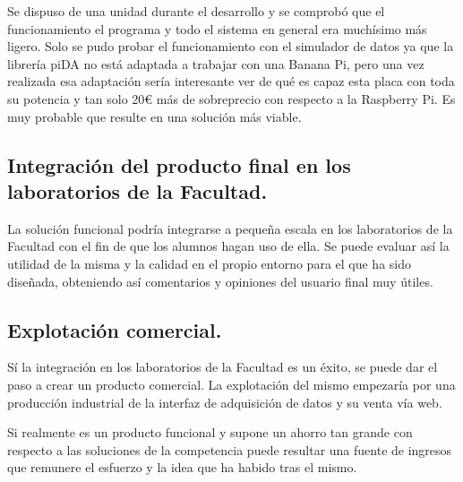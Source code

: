 	Se dispuso de una unidad durante el desarrollo y se comprobó que el funcionamiento el programa y todo el sistema en general era muchísimo más ligero. Solo se pudo probar el funcionamiento con el simulador de datos ya que la librería piDA no está adaptada a trabajar con una Banana Pi, pero una vez realizada esa adaptación sería interesante ver de qué es capaz esta placa con toda su potencia y tan solo 20€ más de sobreprecio con respecto a la Raspberry Pi. Es muy probable que resulte en una solución más viable.
	
	\subsection{Integración del producto final en los laboratorios de la Facultad.}
	La solución funcional podría integrarse a pequeña escala en los laboratorios de la Facultad con el fin de que los alumnos hagan uso de ella. Se puede evaluar así la utilidad de la misma y la calidad en el propio entorno para el que ha sido diseñada, obteniendo así comentarios y opiniones del usuario final muy útiles.
	
	\subsection{Explotación comercial.}
	Sí la integración en los laboratorios de la Facultad es un éxito, se puede dar el paso a crear un producto comercial. La explotación del mismo empezaría por una producción industrial de la interfaz de adquisición de datos y su venta vía web. 
	
	Si realmente es un producto funcional y supone un ahorro tan grande con respecto a las soluciones de la competencia puede resultar una fuente de ingresos que remunere el esfuerzo y la idea que ha habido tras el mismo.